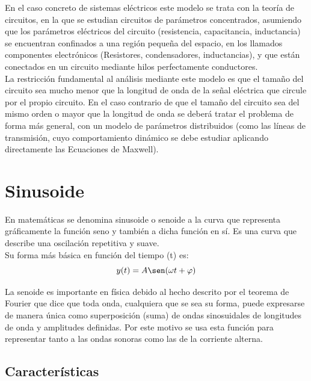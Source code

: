 \documentclass[]{article}
\begin{document}
En el caso concreto de sistemas eléctricos este modelo se trata con la teoría de circuitos, en la que se estudian circuitos de parámetros concentrados, asumiendo que los parámetros eléctricos del circuito (resistencia, capacitancia, inductancia) se encuentran confinados a una región pequeña del espacio, en los llamados componentes electrónicos (Resistores, condensadores, inductancias), y que están conectados en un circuito mediante hilos perfectamente conductores.\\

La restricción fundamental al análisis mediante este modelo es que el tamaño del circuito sea mucho menor que la longitud de onda de la señal eléctrica que circule por el propio circuito. En el caso contrario de que el tamaño del circuito sea del mismo orden o mayor que la longitud de onda se deberá tratar el problema de forma más general, con un modelo de parámetros distribuidos (como las líneas de transmisión, cuyo comportamiento dinámico se debe estudiar aplicando directamente las Ecuaciones de Maxwell).\cite{CircuitoParametrosConcentrados}\\ 

\section{Sinusoide}

En matemáticas se denomina sinusoide o senoide a la curva que representa gráficamente la función seno y también a dicha función en sí. Es una curva que describe una oscilación repetitiva y suave.\\

Su forma más básica en función del tiempo (t) es:\cite{Sinusoide}\\

\begin{equation}
y(t) = A\sen(\omega t + \varphi)
\end{equation}

La senoide es importante en física debido al hecho descrito por el teorema de Fourier que dice que toda onda, cualquiera que se sea su forma, puede expresarse de manera única como superposición (suma) de ondas sinosuidales de longitudes de onda y amplitudes definidas. Por este motivo se usa esta función para representar tanto a las ondas sonoras como las de la corriente alterna.\cite{Sinusoide}\\

\subsection{Características}
\end{document}
